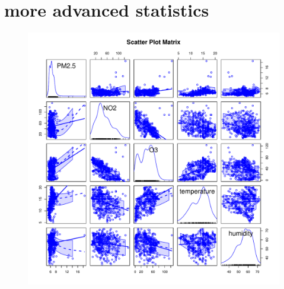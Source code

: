 \documentclass[a4paper,12pt,reqno]{report}
\begin{document}
\section{more advanced statistics}
\label{sec:more advanced statistics}
\begin{figure}[H]
    \centering
    \vspace{-0.35cm}
    \includegraphics[width=0.4\linewidth]{figures/mul_reg_scatterplotMatrix.pdf}
\end{figure}
\end{document}
